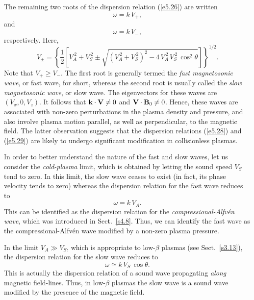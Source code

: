 The remaining two roots of the dispersion relation (\ref{e5.26}) are written
\begin{equation}\label{e5.28}
\omega = k\,V_+,
\end{equation}
and
\begin{equation}\label{e5.29}
\omega = k\,V_-,
\end{equation}
respectively.
Here,
\begin{equation}
V_\pm = \left\{\frac{1}{2}\left[V_A^{~2} + V_S^{~2} \pm \sqrt{
(V_A^{~2} + V_S^{~2})^2 - 4\, V_A^{~2}\,V_S^{~2}\,\cos^2\theta}
\right]\right\}^{1/2}.
\end{equation}
Note that $V_+\geq V_-$. The first root is generally termed the
{\em fast magnetosonic wave}, or fast wave, for short, whereas
the second root is usually called the {\em slow magnetosonic
wave}, or slow wave. The eigenvectors for these waves are
$(V_x,0,V_z)$. It follows that ${\bf k}\cdot{\bf V} \neq 0$ and ${\bf V}\cdot
{\bf B}_0\neq0$. Hence, these waves are associated with non-zero perturbations
in the plasma density and pressure, and also involve plasma motion parallel, as
well as perpendicular, to the magnetic field. The latter observation suggests
that the dispersion relations
(\ref{e5.28}) and (\ref{e5.29}) are likely to undergo significant modification in
collisionless plasmas.

In order to better understand the nature of the fast and slow waves, let us
consider the {\em cold-plasma}\/ limit, which is obtained by letting the sound
speed $V_S$ tend to zero. In this limit, the slow wave ceases to exist (in fact,
its phase velocity tends to zero) whereas the dispersion relation for
the fast wave reduces to
\begin{equation}
\omega = k\,V_A.
\end{equation}
This can be identified as the dispersion relation for the 
{\em compressional-Alfv\'{e}n wave}, which was introduced in Sect.~\ref{s4.8}.
Thus, we can identify the fast wave as the compressional-Alfv\'{e}n wave
modified by a non-zero plasma pressure. 

In the limit $V_A\gg V_S$, which is appropriate to low-$\beta$ plasmas (see
Sect.~\ref{s3.13}), the dispersion relation for the slow wave reduces to
\begin{equation}
\omega \simeq k\,V_S\,\cos\theta.
\end{equation}
This is actually the dispersion relation of a sound wave propagating
{\em along}\/ magnetic field-lines. Thus, in low-$\beta$ plasmas the slow
wave is a sound wave modified by the presence of the magnetic field.


